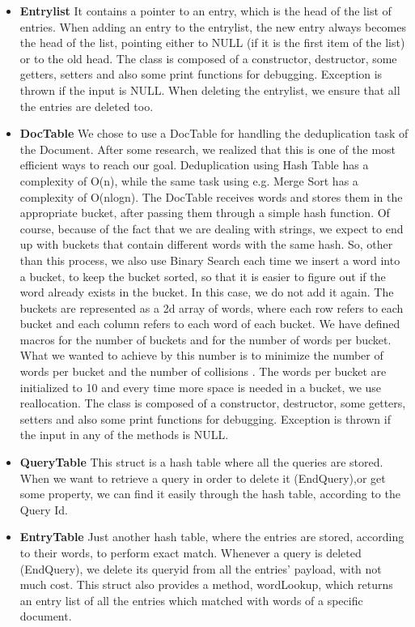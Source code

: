 \documentclass{article}
\begin{document}
\begin{itemize}
  \item \textbf{Entrylist} 
  It contains a pointer to an entry, which is the head of the list of entries. When adding an entry to the entrylist, the new entry always becomes the head of the list, pointing either to NULL (if it is the first item of the list) or to the old head. The class is composed of a constructor, destructor, some getters, setters and also some print functions for debugging. Exception is thrown if the input is NULL.
  When deleting the entrylist, we ensure that all the entries are deleted too.
  \item \textbf{DocTable}
  We chose to use a DocTable for handling the deduplication task of the Document. After some research, we realized that this is one of the most efficient ways to reach our goal.
  Deduplication using Hash Table has a complexity of O(n), while the same task using e.g. Merge Sort has a complexity of O(nlogn). The DocTable receives words and stores them in the appropriate bucket, after passing them through a simple hash function. Of course, because of the fact that we are dealing with strings, we expect to end up with buckets that contain different words with the same hash. So, other than this process, we also use Binary Search each time we insert a word into a bucket, to keep the bucket sorted, so that it is easier to figure out if the word already exists in the bucket. In this case, we do not add it again.
  The buckets are represented as a 2d array of words, where each row refers to each bucket and each column refers to each word of each bucket. We have defined macros for the number of buckets and for the number of words per bucket. What we wanted to achieve by this number is  to minimize the number of words per bucket and the number of collisions . The words per bucket are initialized to 10 and every time more space is needed in a bucket, we use reallocation. The class is composed of a constructor, destructor, some getters, setters and also some print functions for debugging. Exception is thrown if the input in any of the methods is NULL.
  \item \textbf{QueryTable}
  This struct is a hash table where all the queries are stored. When we want to retrieve a query in order to delete it (EndQuery),or get some property, we can find it easily through the hash table, according to the Query Id.
  \item \textbf{EntryTable} 
  Just another hash table, where the entries are stored, according to their words, to perform exact match. Whenever a query is deleted (EndQuery), we delete its queryid from all the entries' payload, with not much cost. This struct also provides a method, wordLookup, which returns an entry list of all the entries which matched with words of a specific document.

\end{itemize}
\end{document}
